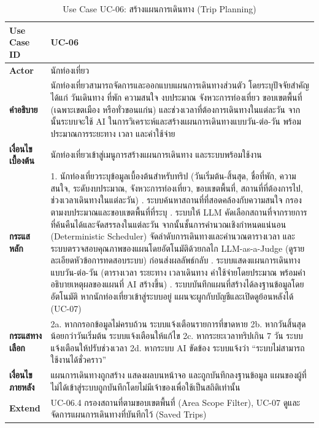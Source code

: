 \begin{table}[H]
\centering
\caption{Use Case UC-06: สร้างแผนการเดินทาง (Trip Planning)}
\label{tab:uc06}
\begin{tabular}{|p{3.2cm}|p{10cm}|}
\hline
\textbf{Use Case ID} & UC-06 \\ \hline
\textbf{Actor} & นักท่องเที่ยว \\ \hline
\textbf{คำอธิบาย} & นักท่องเที่ยวสามารถจัดการและออกแบบแผนการเดินทางส่วนตัว โดยระบุปัจจัยสำคัญ ได้แก่ วันเดินทาง ที่พัก ความสนใจ งบประมาณ จังหวะการท่องเที่ยว ขอบเขตพื้นที่ (เฉพาะเขตเมือง หรือทั่วขอนแก่น) และช่วงเวลาที่ต้องการเดินทางในแต่ละวัน จากนั้นระบบจะใช้ AI ในการวิเคราะห์และสร้างแผนการเดินทางแบบวัน-ต่อ-วัน พร้อมประมาณการระยะทาง เวลา และค่าใช้จ่าย \\ \hline
\textbf{เงื่อนไขเบื้องต้น} & นักท่องเที่ยวเข้าสู่เมนูการสร้างแผนการเดินทาง และระบบพร้อมใช้งาน \\ \hline
\textbf{กระแสหลัก} & 1. นักท่องเที่ยวระบุข้อมูลเบื้องต้นสำหรับทริป (วันเริ่มต้น-สิ้นสุด, ชื่อที่พัก, ความสนใจ, ระดับงบประมาณ, จังหวะการท่องเที่ยว, ขอบเขตพื้นที่, สถานที่ที่ต้องการไป, ช่วงเวลาเดินทางในแต่ละวัน) \newline 2. ระบบค้นหาสถานที่ที่สอดคล้องกับความสนใจ กรองตามงบประมาณและขอบเขตพื้นที่ที่ระบุ \newline 3. ระบบให้ LLM คัดเลือกสถานที่จากรายการที่ค้นคืนได้และจัดสรรลงในแต่ละวัน จากนั้นชั้นการคำนวณเชิงกำหนดแน่นอน (Deterministic Scheduler) จัดลำดับการเดินทางและคำนวณตารางเวลา และระบบตรวจสอบคุณภาพของแผนโดยอัตโนมัติด้วยกลไก LLM-as-a-Judge (ดูรายละเอียดหัวข้อการทดสอบระบบ) ก่อนส่งผลลัพธ์กลับ \newline 4. ระบบแสดงแผนการเดินทางแบบวัน-ต่อ-วัน (ตารางเวลา ระยะทาง เวลาเดินทาง ค่าใช้จ่ายโดยประมาณ พร้อมคำอธิบายเหตุผลของแผนที่ AI สร้างขึ้น) \newline 5. ระบบบันทึกแผนที่สร้างได้ลงฐานข้อมูลโดยอัตโนมัติ หากนักท่องเที่ยวเข้าสู่ระบบอยู่ แผนจะผูกกับบัญชีและเปิดดูย้อนหลังได้ (UC-07) \\ \hline
\textbf{กระแสทางเลือก} & 2a. หากกรอกข้อมูลไม่ครบถ้วน ระบบแจ้งเตือนรายการที่ขาดหาย \newline 2b. หากวันสิ้นสุดน้อยกว่าวันเริ่มต้น ระบบแจ้งเตือนให้แก้ไข \newline 2c. หากระยะเวลาทริปเกิน 7 วัน ระบบแจ้งเตือนให้ปรับช่วงเวลา \newline 2d. หากระบบ AI ขัดข้อง ระบบแจ้งว่า ``ระบบไม่สามารถใช้งานได้ชั่วคราว'' \\ \hline
\textbf{เงื่อนไขภายหลัง} & แผนการเดินทางถูกสร้าง แสดงผลบนหน้าจอ และถูกบันทึกลงฐานข้อมูล แผนของผู้ที่ไม่ได้เข้าสู่ระบบถูกบันทึกโดยไม่มีเจ้าของเพื่อใช้เป็นสถิติเท่านั้น \\ \hline
\textbf{Extend} & UC-06.4 กรองสถานที่ตามขอบเขตพื้นที่ (Area Scope Filter), UC-07 ดูและจัดการแผนการเดินทางที่บันทึกไว้ (Saved Trips) \\
\hline
\end{tabular}
\end{table}

